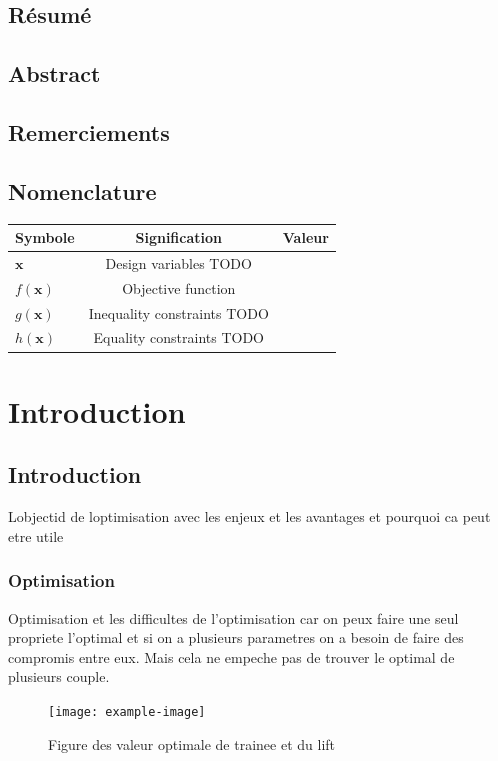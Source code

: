 \documentclass[12pt, a4paper
    ]{book}%
\theoremstyle{definition}
\theoremstyle{remark}
\begin{document}
\section*{Résumé}{
}
\section*{Abstract}{
}
\section*{Remerciements}{
}

\tableofcontents
\listoffigures
\listoftables
\newpage

\section*{Nomenclature}{
\begin{table}[H]
    \begin{tabular}{l c c} %
        \toprule
        Symbole & Signification & Valeur \\
        \midrule
        $\bm{x}$ & Design variables TODO& \\
        $f(\bm{x})$ & Objective function & \\
        $g(\bm{x})$ & Inequality constraints TODO& \\
        $h(\bm{x})$ & Equality constraints TODO& \\
        \bottomrule
    \end{tabular}
\end{table}
      
}

\newpage



\newpage    
{}

\chapter{Introduction}
\section{Introduction}
Lobjectid de loptimisation avec les enjeux et les avantages et pourquoi ca peut etre utile
\subsection{Optimisation}
Optimisation et les difficultes de l'optimisation car on peux faire une seul propriete l'optimal et si on a plusieurs parametres on a besoin de faire des compromis entre eux. Mais cela ne empeche pas de trouver le optimal de plusieurs couple. 
\begin{figure}[H]
    \centering
    \texttt{[image: example-image]}
    \caption{Figure des valeur optimale de trainee et du lift}
\end{figure}
\end{document}
